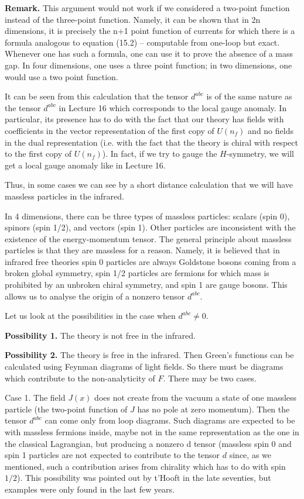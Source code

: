 {\bf Remark.} This argument would not work if we considered a two-point 
function instead of the three-point function. 
Namely, it can be shown that in 2n dimensions, it is precisely the
n+1 point function of currents for which there is a formula analogous
to equation (15.2) -- computable from one-loop but exact.  Whenever one has
such a formula, one can use it to prove the absence of a mass gap.
In four dimensions, one uses a three point function; in two dimensions,
one would use a two point function.

It can be seen from this calculation that 
the tensor $d^{abc}$ is of the same nature  
as the tensor $d^{abc}$ in Lecture 16 which corresponds to the  
local gauge anomaly. In particular, its presence has to do with 
the fact that our theory has fields with coefficients in 
the vector representation of the first copy of $U(n_f)$ and no fields 
in the dual representation (i.e. with the fact that the theory 
is chiral with respect to the first copy of $U(n_f)$). 
In fact, if we try to gauge the $H$-symmetry, we will get a 
local gauge anomaly like in Lecture 16.  

Thus, in some cases we can see by a short distance calculation 
that we will have massless particles in the infrared. 

In 4 dimensions, there can be three types of massless particles:
scalars (spin 0), spinors (spin 1/2), and vectors (spin 1). 
Other particles are inconsistent with the existence of the energy-momentum 
tensor. The general principle about massless particles is that they are 
massless for a reason. Namely, it is believed  that in infrared free theories 
spin 0 particles 
are always Goldstone bosons coming from a broken global symmetry, 
spin 1/2 particles are fermions for which mass is prohibited by an unbroken 
chiral symmetry, and spin 1 are gauge bosons. 
This allows us to analyse the origin of a nonzero tensor $d^{abc}$. 

Let us look at the possibilities
in the case when $d^{abc}\ne 0$. 

{\bf Possibility 1.} The theory is not free in the infrared. 

{\bf Possibility 2.} The theory is free in the infrared. 
Then Green's functions can be calculated using Feynman diagrams of light 
fields. So there must be diagrams which contribute to the non-analyticity 
of $F$. There may be two cases. 

Case 1. The field $J(x)$ does not 
create from the vacuum a state of one massless
particle (the two-point function of $J$ has no pole at zero momentum). 
Then the tensor $d^{abc}$ can come only from loop diagrams. 
Such diagrams are expected to be with 
massless fermions inside, maybe not in the same representation as the one
in the classical Lagrangian, but producing a nonzero d tensor
(massless spin 0 and spin 1 particles 
are not expected to contribute to the tensor $d$ 
since, as we mentioned, 
such a contribution arises from chirality which has to do with spin 
$1/2$). 
This possibility was pointed out by t'Hooft in the late seventies, 
but examples were only found in the last few years. 
 

